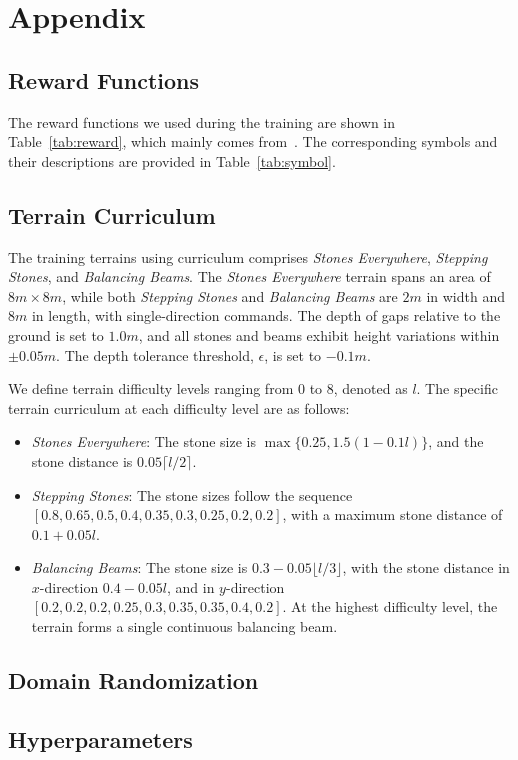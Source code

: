 \section*{Appendix}

\subsection{Reward Functions}
\label{sec:append_reward}
The reward functions we used during the training are shown in Table~\ref{tab:reward}, which mainly comes from~\cite{agarwal2023legged, fu2021minimizing, kumar2021rma, margolis2023walk, long2024learninghumanoid}. The corresponding symbols and their descriptions are provided in Table~\ref{tab:symbol}.
\vspace{-0.1cm}


\vspace{-0.35cm}

\vspace{-0.1cm}

\subsection{Terrain Curriculum}
\label{sec:append_curriculum}
The training terrains using curriculum comprises \textit{Stones Everywhere}, \textit{Stepping Stones}, and \textit{Balancing Beams}. The \textit{Stones Everywhere} terrain spans an area of $8m\times8m$, while both \textit{Stepping Stones} and \textit{Balancing Beams} are $2m$ in width and $8m$ in length, with single-direction commands. The depth of gaps relative to the ground is set to $1.0m$, and all stones and beams exhibit height variations within $\pm 0.05m$. The depth tolerance threshold, $\epsilon$, is set to $-0.1 m$.

We define terrain difficulty levels ranging from 0 to 8, denoted as $l$. The specific terrain curriculum at each difficulty level are as follows:
\begin{itemize}
    \item \textit{Stones Everywhere}: The stone size is $\max\{0.25, 1.5(1-0.1l)\}$, and the stone distance is $0.05\lceil l/2\rceil$.
    \item \textit{Stepping Stones}: The stone sizes follow the sequence $[0.8, 0.65, 0.5, 0.4, 0.35, 0.3, 0.25, 0.2, 0.2]$, with a maximum stone distance of $0.1 + 0.05l$.
    \item \textit{Balancing Beams}: The stone size is $0.3-0.05\lfloor l/3\rfloor$, with the stone distance in $x$-direction $0.4 - 0.05l$, and in $y$-direction $[0.2, 0.2, 0.2, 0.25, 0.3, 0.35, 0.35, 0.4, 0.2]$. At the highest difficulty level, the terrain forms a single continuous balancing beam.
\end{itemize}

\subsection{Domain Randomization}
\label{sec:append_random}

\vspace{-0.15cm}

\subsection{Hyperparameters}
\vspace{-0.15cm}
